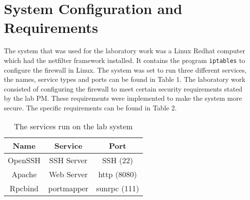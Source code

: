 \section{System Configuration and Requirements}
\label{sec:setup}
The system that was used for the laboratory work was a Linux Redhat computer which had the netfilter framework installed. It contains the program \verb;iptables; to configure the firewall in Linux. The system was set to run three different services, the names, service types and ports can be found in Table 1. The laboratory work consisted of configuring the firewall to meet certain security requirements stated by the lab PM. These requirements were implemented to make the system more secure. The specific requirements can be found in Table 2.

\begin{table}[h]
\centering
	\begin{tabular}{| c | c | c |}
	\hline
	 Name & Service & Port \\ \hline
	 OpenSSH & SSH Server & SSH (22) \\
	 Apache & Web Server & http (8080) \\
	 Rpcbind & portmapper & sunrpc (111) \\ 
	\hline
	\end{tabular}
	\caption{The services run on the lab system}
	\label{Service table}
\end{table}

